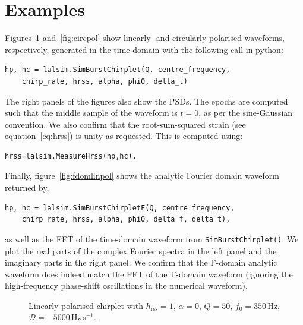 \documentclass[11pt]{ligovirgodcc}
\begin{document}
\section{Examples}
Figures~\ref{fig:linpol} and~\ref{fig:circpol} show linearly- and
circularly-polarised waveforms, respectively,  generated in the time-domain with
the following call in python:%
\begin{lstlisting}
hp, hc = lalsim.SimBurstChirplet(Q, centre_frequency, 
    chirp_rate, hrss, alpha, phi0, delta_t)
\end{lstlisting}
%
The right panels of the figures also show the PSDs.  The epochs are computed
such that the middle sample of the waveform is $t=0$, as per the sine-Gaussian
convention.  We also confirm that the root-sum-squared strain (see
equation~\ref{eq:hrss}) is unity as requested.  This is computed using:
\begin{lstlisting}
hrss=lalsim.MeasureHrss(hp,hc).
\end{lstlisting}
%
Finally, figure~\ref{fig:fdomlinpol} shows the analytic Fourier domain waveform
returned by,
\begin{lstlisting}
hp, hc = lalsim.SimBurstChirpletF(Q, centre_frequency, 
    chirp_rate, hrss, alpha, phi0, delta_f, delta_t),
\end{lstlisting}
as well as the FFT of the time-domain waveform from {\tt SimBurstChirplet()}.
We plot the real parts of the complex Fourier spectra in the left panel and the
imaginary parts in the right panel.  We confirm that the F-domain analytic waveform
does indeed match the FFT of the T-domain waveform (ignoring the high-frequency
phase-shift oscillations in the numerical waveform).


\begin{figure}
\centering
{}
\caption{Linearly polarised chirplet with $h_{\mathrm{rss}}=1$, $\alpha=0$,
$Q=50$, $f_0=350$\,Hz, $\mathcal{D}=-5000$\,Hz\,s$^{-1}$.\label{fig:linpol}}
\end{figure}
\end{document}
